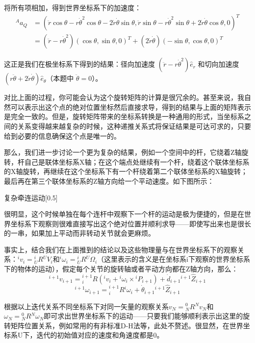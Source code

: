 将所有项相加，得到世界坐标系下的加速度：
\[\begin{aligned}
    {}^A a_Q &= (\ddot{r}\cos\theta-r\dot{\theta}^2\cos\theta-2\dot{r}\dot{\theta}\sin\theta,\ddot{r}\sin\theta-r\dot{\theta}^2\sin\theta+2\dot{r}\dot{\theta}\cos\theta,0)^T \\
    &= (\ddot{r}-r\dot{\theta}^2)(\cos\theta,\sin\theta,0)^T + (2\dot{r}\dot{\theta})(-\sin\theta,\cos\theta,0)^T
\end{aligned}\]

这正是我们在极坐标系下得到的结果：径向加速度 \( (\ddot{r}-r\dot{\theta}^2)\hat{e}_r \) 和切向加速度 \( (r\ddot{\theta}+2\dot{r}\dot{\theta})\hat{e}_{\theta} \)（本题中 \( \ddot{\theta}=0 \)）。

对比上面的过程，你可能会认为这个旋转矩阵的计算是很冗余的。甚至来说，我自然可以表示出这个点的绝对位置坐标然后直接求导，得到的结果与上面的矩阵表示是完全一致的。但是，旋转矩阵带来的坐标系转换是一种通用的形式，当坐标系之间的关系变得越来越复杂的时候，这种递推关系式将保证结果是可达可求的，只要给到必要的信息确保这个点是唯一的。

那么，我们进一步讨论一个更为复杂的结果，例如一个空间中的杆，它绕着Z轴旋转，杆自己是联体坐标系X轴；在这个端点处继续有一个杆，绕着这个联体坐标系的X轴旋转，再继续在这个坐标系下有一个杆绕着第二个联体坐标系的X轴旋转；最后再在第三个联体坐标系的Z轴方向给一个平动速度。如下图所示：
\begin{singlefigure}[一种复杂运动的例子]{复杂牵连运动}[0.5]
\end{singlefigure}

很明显，这个时候单独在每个连杆中观察下一个杆的运动是极为便捷的，但是在世界坐标系下观察则很难直接写出这个绝对位置并顺利求导——即使写出来也是很长的一串，如果加上平动而非转动关节就会更麻烦。

事实上，结合我们在上面推到的结论以及这些物理量与在世界坐标系下的观察关系：${}^i v_i = {}^i_U R {}^U V_i$和${}^i \omega_i = {}^i_U R {}^U \Omega_i$（这里表示的含义是在坐标系i下观察的世界坐标系下的物体的运动），假定每个关节的旋转轴或者平动方向都在Z轴方向，那么：
\[{}^{i+1} v_{i+1} = {}^{i+1}_i R ({}^i v_i + {}^i \omega_i \times {}^i P_{i+1}) + \dot{d}_{i+1}{}^{i+1}\hat{Z}_{i+1}\]
\[{}^{i+1} \omega_{i+1} = {}^{i+1}_i R {}^i \omega_i + \dot{\theta}_{i+1} {}^{i+1}\hat{Z}_{i+1}\]

根据以上迭代关系不同坐标系下对同一矢量的观察关系$v_N = {}^0_N R {}^N v_N$和$\omega_N = {}^0_N R {}^N \omega_N$即可求出世界坐标系下的运动——只要我们能够顺利表示出这里的旋转矩阵位置关系，例如常用的有非标准D-H法等，此处不赘述。很显然，在世界坐标系U下，迭代的初始值对应的速度和角速度都是0。



\let\thesection\oldthesection
\let\thesubsection\oldthesubsection
{}
